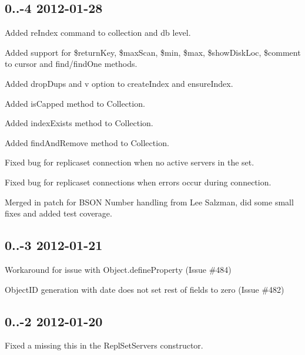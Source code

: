 \subsection*{0..-\/4 2012-\/01-\/28 }


\begin{DoxyItemize}
\item Added re\+Index command to collection and db level.
\item Added support for \$return\+Key, \$max\+Scan, \$min, \$max, \$show\+Disk\+Loc, \$comment to cursor and find/find\+One methods.
\item Added drop\+Dups and v option to create\+Index and ensure\+Index.
\item Added is\+Capped method to Collection.
\item Added index\+Exists method to Collection.
\item Added find\+And\+Remove method to Collection.
\item Fixed bug for replicaset connection when no active servers in the set.
\item Fixed bug for replicaset connections when errors occur during connection.
\item Merged in patch for B\+S\+ON Number handling from Lee Salzman, did some small fixes and added test coverage.
\end{DoxyItemize}

\subsection*{0..-\/3 2012-\/01-\/21 }


\begin{DoxyItemize}
\item Workaround for issue with Object.\+define\+Property (Issue \#484)
\item Object\+ID generation with date does not set rest of fields to zero (Issue \#482)
\end{DoxyItemize}

\subsection*{0..-\/2 2012-\/01-\/20 }


\begin{DoxyItemize}
\item Fixed a missing this in the Repl\+Set\+Servers constructor.
\end{DoxyItemize}

